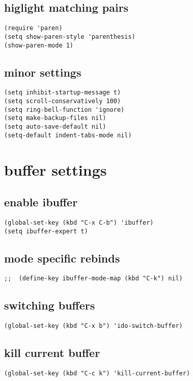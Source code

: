 \documentclass[11pt]{article}
\begin{document}
\subsection{higlight matching pairs}
\label{sec:org8d5dd9a}
\begin{verbatim}
(require 'paren)
(setq show-paren-style 'parenthesis)
(show-paren-mode 1)
\end{verbatim}
\subsection{minor settings}
\label{sec:org793a931}
\begin{verbatim}
(setq inhibit-startup-message t)
(setq scroll-conservatively 100)
(setq ring-bell-function 'ignore)
(setq make-backup-files nil)
(setq auto-save-default nil)
(setq-default indent-tabs-mode nil)
\end{verbatim}
\section{buffer settings}
\label{sec:orgc68c0ca}
\subsection{enable ibuffer}
\label{sec:org66a76a1}
\begin{verbatim}
(global-set-key (kbd "C-x C-b") 'ibuffer)
(setq ibuffer-expert t)
\end{verbatim}
\subsection{mode specific rebinds}
\label{sec:orgac22e75}
\begin{verbatim}
;;  (define-key ibuffer-mode-map (kbd "C-k") nil)
\end{verbatim}
\subsection{switching buffers}
\label{sec:org855257f}
\begin{verbatim}
(global-set-key (kbd "C-x b") 'ido-switch-buffer)
\end{verbatim}
\subsection{kill current buffer}
\label{sec:orgad9f921}
\begin{verbatim}
(global-set-key (kbd "C-c k") 'kill-current-buffer)
\end{verbatim}
\end{document}
